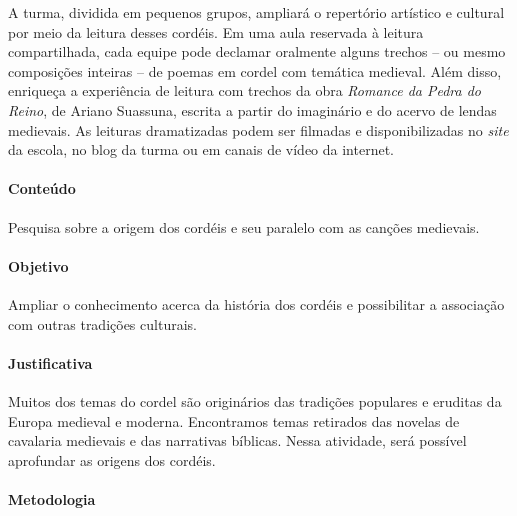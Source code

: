 \documentclass[12pt]{extarticle}
\begin{document}

  A turma, dividida em pequenos grupos, ampliará o
  repertório artístico e cultural por meio da leitura desses cordéis. Em
  uma aula reservada à leitura compartilhada, cada equipe pode declamar
  oralmente alguns trechos -- ou mesmo composições inteiras -- de poemas
  em cordel com temática medieval. Além disso, enriqueça a experiência
  de leitura com trechos da obra \emph{Romance da Pedra do Reino}, de
  Ariano Suassuna, escrita a partir do imaginário e do acervo de lendas
  medievais. As leituras dramatizadas podem ser filmadas e
  disponibilizadas no \emph{site} da escola, no blog da turma ou em
  canais de vídeo da internet.

\paragraph{Conteúdo} Pesquisa sobre a origem dos cordéis e seu paralelo com as canções medievais.

\paragraph{Objetivo} Ampliar o conhecimento acerca da história dos cordéis e possibilitar a associação com outras tradições culturais.

\paragraph{Justificativa} Muitos dos temas do cordel são
originários das tradições populares e eruditas da Europa medieval
e moderna. Encontramos temas retirados das novelas
de cavalaria medievais e das narrativas bíblicas. Nessa atividade,
será possível aprofundar as origens dos cordéis.

\paragraph{Metodologia}
\end{document}
